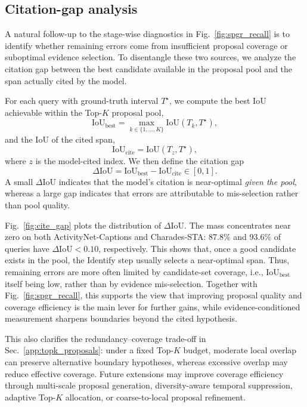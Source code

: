 \documentclass{article}
\theoremstyle{plain}
\theoremstyle{definition}
\theoremstyle{remark}
\begin{document}
\subsection{Citation-gap analysis}
\label{app:cite_gap}
A natural follow-up to the stage-wise diagnostics in Fig.~\ref{fig:spgr_recall} is to identify whether remaining errors come from insufficient proposal coverage or suboptimal evidence selection.
To disentangle these two sources, we analyze the citation gap between the best candidate available in the proposal pool and the span actually cited by the model.

For each query with ground-truth interval $T^\star$, we compute the best IoU achievable within the Top-$K$ proposal pool,
\begin{equation}
\mathrm{IoU}_{\mathrm{best}}
=
\max_{k\in\{1,\ldots,K\}}
\mathrm{IoU}(T_k, T^\star),
\end{equation}
and the IoU of the cited span,
\begin{equation}
\mathrm{IoU}_{\mathrm{cite}}
=
\mathrm{IoU}(T_z, T^\star),
\end{equation}
where $z$ is the model-cited index.
We then define the citation gap
\begin{equation}
\Delta\mathrm{IoU}
=
\mathrm{IoU}_{\mathrm{best}}-\mathrm{IoU}_{\mathrm{cite}}
\in[0,1].
\end{equation}
A small $\Delta\mathrm{IoU}$ indicates that the model's citation is near-optimal \emph{given the pool}, whereas a large gap indicates that errors are attributable to mis-selection rather than pool quality.

Fig.~\ref{fig:cite_gap} plots the distribution of $\Delta\mathrm{IoU}$.
The mass concentrates near zero on both ActivityNet-Captions and Charades-STA: 87.8\% and 93.6\% of queries have $\Delta\mathrm{IoU}<0.10$, respectively.
This shows that, once a good candidate exists in the pool, the Identify step usually selects a near-optimal span.
Thus, remaining errors are more often limited by candidate-set coverage, i.e., $\mathrm{IoU}_{\mathrm{best}}$ itself being low, rather than by evidence mis-selection.
Together with Fig.~\ref{fig:spgr_recall}, this supports the view that improving proposal quality and coverage efficiency is the main lever for further gains, while evidence-conditioned measurement sharpens boundaries beyond the cited hypothesis.

This also clarifies the redundancy--coverage trade-off in Sec.~\ref{app:topk_proposals}: under a fixed Top-$K$ budget, moderate local overlap can preserve alternative boundary hypotheses, whereas excessive overlap may reduce effective coverage.
Future extensions may improve coverage efficiency through multi-scale proposal generation, diversity-aware temporal suppression, adaptive Top-$K$ allocation, or coarse-to-local proposal refinement.
\end{document}
